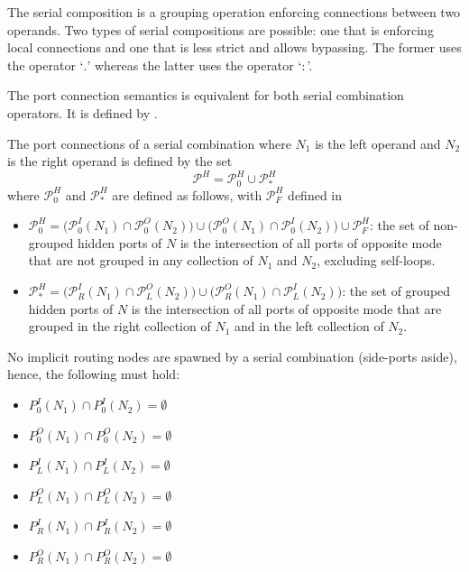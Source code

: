 The serial composition is a grouping operation enforcing connections between two operands.
Two types of serial compositions are possible: one that is enforcing local connections and one that is less strict and allows bypassing.
The former uses the operator `$.$' whereas the latter uses the operator `$:$'.

The port connection semantics is equivalent for both serial combination operators. It is defined by \Def{\ref{def_smx_sc}}.
\begin{definition}
    \label{def_smx_sc}
    The port connections of a serial combination where $N_1$ is the left operand and $N_2$ is the right operand is defined by the set
    $$\mathcal{P}^H = \mathcal{P}_0^H \cup \mathcal{P}_*^H$$
    where $\mathcal{P}_0^H$ and $\mathcal{P}_*^H$ are defined as follows, with $\mathcal{P}_F^H$ defined in \Def{\ref{def_smx_self}}
    \begin{itemize}
        \item $\mathcal{P}_0^H = \big ( \mathcal{P}_0^I(N_1) \cap \mathcal{P}_0^O(N_2)) \cup (\mathcal{P}_0^O(N_1) \cap \mathcal{P}_0^I(N_2) \big ) \cup \mathcal{P}_F^H$:
            the set of non-grouped hidden ports of $N$ is the intersection of all ports of opposite mode that are not grouped in any collection of $N_1$ and $N_2$, excluding self-loops.
        \item $\mathcal{P}_*^H = \big ( \mathcal{P}_R^I(N_1) \cap \mathcal{P}_L^O(N_2)) \cup (\mathcal{P}_R^O(N_1) \cap \mathcal{P}_L^I(N_2) \big )$:
            the set of grouped hidden ports of $N$ is the intersection of all ports of opposite mode that are grouped in the right collection of $N_1$ and in the left collection of $N_2$.
    \end{itemize}
    No implicit routing nodes are spawned by a serial combination (side-ports aside), hence, the following must hold:
    \begin{itemize}
        \item $P_0^I(N_1) \cap P_0^I(N_2) = \emptyset$
        \item $P_0^O(N_1) \cap P_0^O(N_2) = \emptyset$
        \item $P_L^I(N_1) \cap P_L^I(N_2) = \emptyset$
        \item $P_L^O(N_1) \cap P_L^O(N_2) = \emptyset$
        \item $P_R^I(N_1) \cap P_R^I(N_2) = \emptyset$
        \item $P_R^O(N_1) \cap P_R^O(N_2) = \emptyset$
    \end{itemize}
\end{definition}

